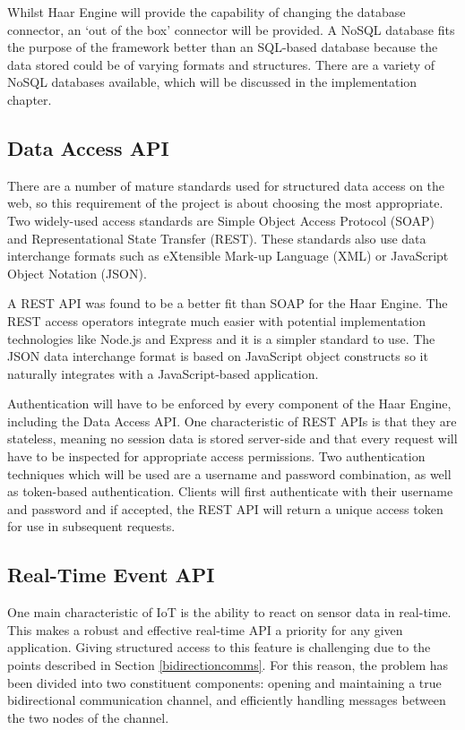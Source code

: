       Whilst Haar Engine will provide the capability of changing the database connector, an `out of the box' connector will be provided. A NoSQL database fits the purpose of the framework better than an SQL-based database because the data stored could be of varying formats and structures. There are a variety of NoSQL databases available, which will be discussed in the implementation chapter.

    \subsection{Data Access API}
      There are a number of mature standards used for structured data access on the web, so this requirement of the project is about choosing the most appropriate. Two widely-used access standards are Simple Object Access Protocol (SOAP) and Representational State Transfer (REST). These standards also use data interchange formats such as eXtensible Mark-up Language (XML) or JavaScript Object Notation (JSON).

      A REST API was found to be a better fit than SOAP for the Haar Engine. The REST access operators integrate much easier with potential implementation technologies like Node.js and Express and it is a simpler standard to use. The JSON data interchange format is based on JavaScript object constructs so it naturally integrates with a JavaScript-based application.

      Authentication will have to be enforced by every component of the Haar Engine, including the Data Access API. One characteristic of REST APIs is that they are stateless, meaning no session data is stored server-side and that every request will have to be inspected for appropriate access permissions. Two authentication techniques which will be used are a username and password combination, as well as token-based authentication. Clients will first authenticate with their username and password and if accepted, the REST API will return a unique access token for use in subsequent requests.

    \subsection{Real-Time Event API}
      One main characteristic of IoT is the ability to react on sensor data in real-time. This makes a robust and effective real-time API a priority for any given application. Giving structured access to this feature is challenging due to the points described in Section \ref{bidirectioncomms}. For this reason, the problem has been divided into two constituent components: opening and maintaining a true bidirectional communication channel, and efficiently handling messages between the two nodes of the channel.

